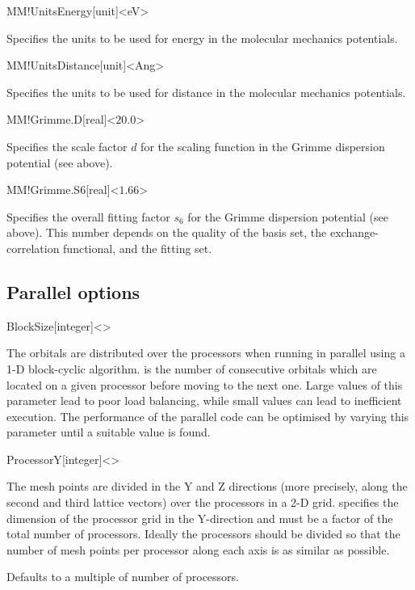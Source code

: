 \begin{fdfentry}{MM!UnitsEnergy}[unit]<eV>

  Specifies the units to be used for energy in the
  molecular mechanics potentials.
  
\end{fdfentry}

\begin{fdfentry}{MM!UnitsDistance}[unit]<Ang>
  
  Specifies the units to be used for distance in the
  molecular mechanics potentials.

\end{fdfentry}

\begin{fdfentry}{MM!Grimme.D}[real]<$20.0$>

  Specifies the scale factor $d$ for the scaling function
  in the Grimme dispersion potential (see above).

\end{fdfentry}

\begin{fdfentry}{MM!Grimme.S6}[real]<$1.66$>

  Specifies the overall fitting factor $s_6$ for the
  Grimme dispersion potential (see above). This number depends on the
  quality of the basis set, the exchange-correlation functional, and the
  fitting set.
  
\end{fdfentry}


\subsection{Parallel options}


\begin{fdfentry}{BlockSize}[integer]<>

  The orbitals are distributed over the processors when running in
  parallel using a 1-D block-cyclic algorithm.  is
  the number of consecutive orbitals which are located on a given
  processor before moving to the next one. Large values of this
  parameter lead to poor load balancing, while small values can lead
  to inefficient execution. The performance of the parallel code can
  be optimised by varying this parameter until a suitable value is
  found.

\end{fdfentry}

\begin{fdfentry}{ProcessorY}[integer]<>
  
  The mesh points are divided in the Y and Z directions (more
  precisely, along the second and third lattice vectors) over the
  processors in a 2-D grid.  specifies the
  dimension of the processor grid in the Y-direction and must be a
  factor of the total number of processors. Ideally the processors
  should be divided so that the number of mesh points per processor
  along each axis is as similar as possible.

  Defaults to a multiple of number of processors.

\end{fdfentry}


